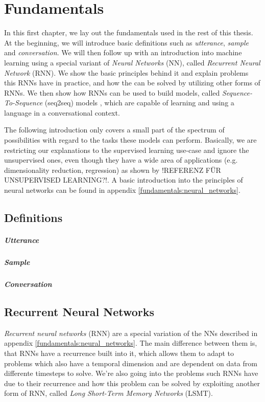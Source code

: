 \chapter{Fundamentals}
\label{chapter:fundamental}
In this first chapter, we lay out the fundamentals used in the rest of this thesis. At the beginning, we will introduce basic definitions such as \emph{utterance}, \emph{sample} and \emph{conversation}. We will then follow up with an introduction into machine learning using a special variant of \emph{Neural Networks} (NN), called \emph{Recurrent Neural Network} (RNN). We show the basic principles behind it and explain problems this RNNs have in practice, and how the can be solved by utilizing other forms of RNNs. We then show how RNNs can be used to build models, called \emph{Sequence-To-Sequence} (seq2seq) models \cite{Sutskever:2014}, which are capable of learning and using a language in a conversational context.

The following introduction only covers a small part of the spectrum of possibilities with regard to the tasks these models can perform. Basically, we are restricting our explanations to the supervised learning use-case and ignore the unsupervised ones, even though they have a wide area of applications (e.g. dimensionality reduction, regression) as shown by !REFERENZ FÜR UNSUPERVISED LEARNING?!. A basic introduction into the principles of neural networks can be found in appendix \ref{fundamentals:neural_networks}.

\section{Definitions}
\paragraph{Utterance} \blindtext
\paragraph{Sample} \blindtext
\paragraph{Conversation} \blindtext

\section{Recurrent Neural Networks}
\emph{Recurrent neural networks} (RNN) are a special variation of the NNs described in appendix \ref{fundamentals:neural_networks}. The main difference between them is, that RNNs have a recurrence built into it, which allows them to adapt to problems which also have a temporal dimension and are dependent on data from differente timesteps to solve. We're also going into the problems such RNNs have due to their recurrence and how this problem can be solved by exploiting another form of RNN, called \emph{Long Short-Term Memory Networks} (LSMT).

